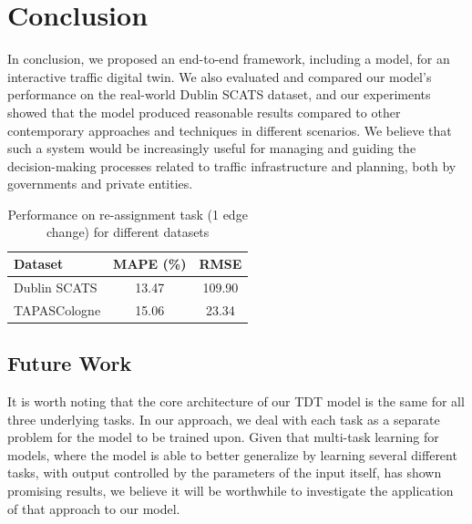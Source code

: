 \documentclass[conference]{IEEEtran}
\begin{document}
\section{Conclusion}
In conclusion, we proposed an end-to-end framework, including a model, for an interactive traffic digital twin. We also evaluated and compared our model's performance on the real-world Dublin SCATS dataset, and our experiments showed that the model produced reasonable results compared to other contemporary approaches and techniques in different scenarios. We believe that such a system would be increasingly useful for managing and guiding the decision-making processes related to traffic infrastructure and planning, both by governments and private entities.


\begin{table}[]
\centering
\caption{Performance on re-assignment task (1 edge change) for different datasets}
\label{reassign_table}
\begin{tabular}{lcc}
\toprule
Dataset & MAPE (\%) & RMSE \\
\midrule
Dublin SCATS & 13.47 & 109.90 \\
TAPASCologne & 15.06 & 23.34 \\
\bottomrule
\end{tabular}
\end{table}

\subsection*{Future Work}
It is worth noting that the core architecture of our TDT model is the same for all three underlying tasks. In our approach, we deal with each task as a separate problem for the model to be trained upon. Given that multi-task learning for models, where the model is able to better generalize by learning several different tasks, with output controlled by the parameters of the input itself, has shown promising results, we believe it will be worthwhile to investigate the application of that approach to our model.




\end{document}
